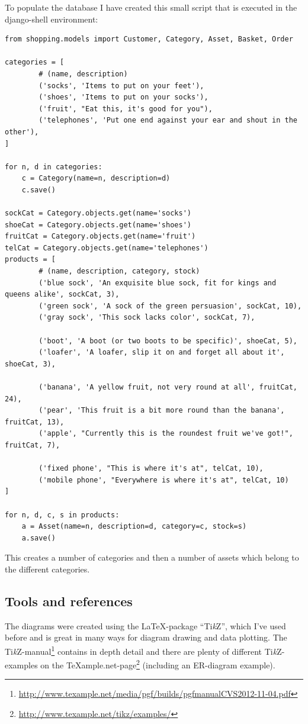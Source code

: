 \documentclass[12pt, a4paper,titlepage]{article}
\begin{document}
To populate the database I have created this small script that is executed in the
django-shell environment:
\lstset{language=Python}
\begin{lstlisting}
from shopping.models import Customer, Category, Asset, Basket, Order

categories = [ 
        # (name, description)
        ('socks', 'Items to put on your feet'),
        ('shoes', 'Items to put on your socks'),
        ('fruit', "Eat this, it's good for you"),
        ('telephones', 'Put one end against your ear and shout in the other'),
]   

for n, d in categories:
    c = Category(name=n, description=d)
    c.save()

sockCat = Category.objects.get(name='socks')
shoeCat = Category.objects.get(name='shoes')
fruitCat = Category.objects.get(name='fruit')
telCat = Category.objects.get(name='telephones')
products = [ 
        # (name, description, category, stock)
        ('blue sock', 'An exquisite blue sock, fit for kings and queens alike', sockCat, 3), 
        ('green sock', 'A sock of the green persuasion', sockCat, 10),
        ('gray sock', 'This sock lacks color', sockCat, 7), 

        ('boot', 'A boot (or two boots to be specific)', shoeCat, 5), 
        ('loafer', 'A loafer, slip it on and forget all about it', shoeCat, 3), 
    
        ('banana', 'A yellow fruit, not very round at all', fruitCat, 24),
        ('pear', 'This fruit is a bit more round than the banana', fruitCat, 13),
        ('apple', "Currently this is the roundest fruit we've got!", fruitCat, 7), 

        ('fixed phone', "This is where it's at", telCat, 10),
        ('mobile phone', "Everywhere is where it's at", telCat, 10) 
]   

for n, d, c, s in products:
    a = Asset(name=n, description=d, category=c, stock=s)
    a.save()
\end{lstlisting}
This creates a number of categories and then a number of assets which
belong to the different categories.

\subsection{Tools and references}
The diagrams were created using the \LaTeX-package
``Ti\emph{k}Z'', which I've used before and is great in many ways for diagram
drawing and data plotting. The Ti\emph{k}Z-manual\footnote{\url{http://www.texample.net/media/pgf/builds/pgfmanualCVS2012-11-04.pdf}} 
contains in depth detail and there are plenty of different 
Ti\emph{k}Z-examples on the \TeX ample.net-page\footnote{
\url{http://www.texample.net/tikz/examples/}} (including an ER-diagram example).
\end{document}
